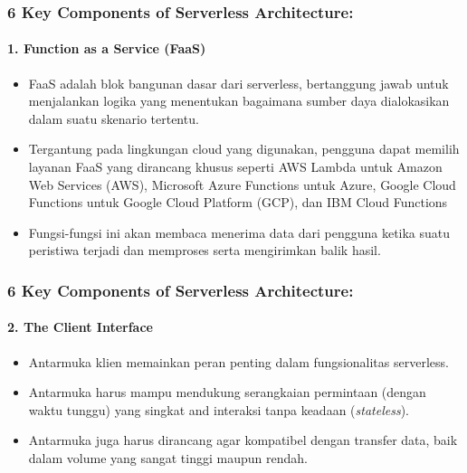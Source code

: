 \documentclass[aspectratio=169, table]{beamer}
\begin{document}
    \begin{frame}
        \frametitle{6 Key Components of Serverless Architecture:}
        \framesubtitle{1. Function as a Service (FaaS)}
        \begin{itemize}
            \item
            FaaS adalah blok bangunan dasar dari serverless, bertanggung jawab untuk menjalankan logika yang menentukan bagaimana sumber daya dialokasikan dalam suatu skenario tertentu.
            \item Tergantung pada lingkungan cloud yang digunakan, pengguna dapat memilih layanan FaaS yang dirancang khusus seperti AWS Lambda untuk Amazon Web Services (AWS), Microsoft Azure Functions untuk Azure, Google Cloud Functions untuk Google Cloud Platform (GCP), dan IBM Cloud Functions
            \item Fungsi-fungsi ini akan membaca menerima data dari pengguna ketika suatu peristiwa terjadi dan memproses serta mengirimkan balik hasil.
        \end{itemize}
    \end{frame}

    \begin{frame}
        \frametitle{6 Key Components of Serverless Architecture:}
        \framesubtitle{2. The Client Interface}
        \begin{itemize}
            \item
            Antarmuka klien memainkan peran penting dalam fungsionalitas serverless.
            \item Antarmuka harus mampu mendukung serangkaian permintaan (dengan waktu tunggu) yang singkat and interaksi tanpa keadaan (\textit{stateless}).
            \item Antarmuka juga harus dirancang agar kompatibel dengan transfer data, baik dalam volume yang sangat tinggi maupun rendah.
        \end{itemize}
    \end{frame}
\end{document}
